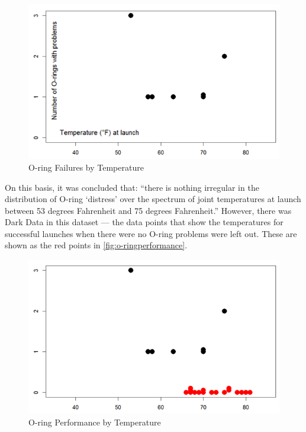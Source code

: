 \begin{figure}[htbp]
  \centering
  \includegraphics[width=\textwidth/2]{images/darkfailures}
  \caption{O-ring Failures by Temperature}
  \label{fig:o-ringfailures}
\end{figure}

On this basis, it was concluded that: 
``there is nothing irregular in the distribution of O-ring ‘distress’ over the spectrum of joint temperatures at launch between 53 degrees Fahrenheit and 75 degrees Fahrenheit.''
However, there was Dark Data in this dataset --- the data points that show the temperatures for successful launches when there were no O-ring problems were left out. These are shown as the red points in \autoref{fig:o-ringperformance}.

\begin{figure}[htbp]
  \centering
  \includegraphics[width=\textwidth/2]{images/darkperformance}
  \caption{O-ring Performance by Temperature}
  \label{fig:o-ringperformance}
\end{figure}

